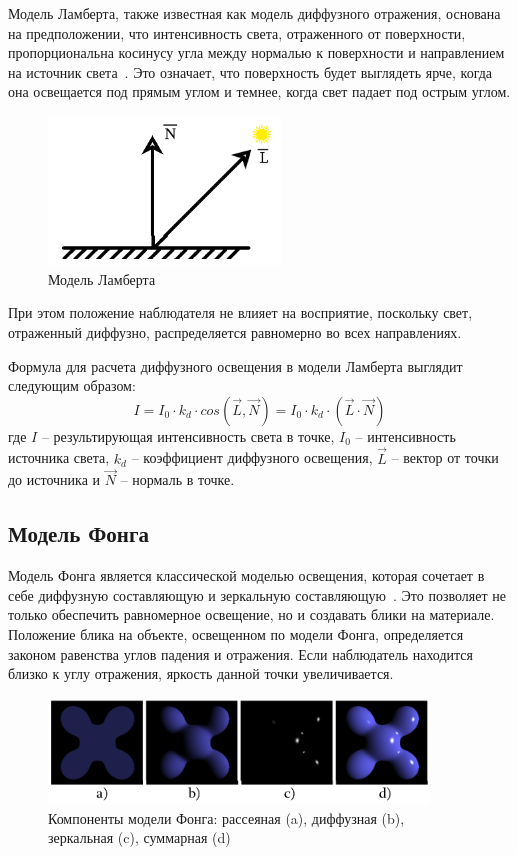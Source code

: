 Модель Ламберта, также известная как модель диффузного отражения, основана на предположении, что интенсивность света, отраженного от поверхности, пропорциональна косинусу угла между нормалью к поверхности и направлением на источник света~\cite{lit3, lit7}. Это означает, что поверхность будет выглядеть ярче, когда она освещается под прямым углом и темнее, когда свет падает под острым углом. 
\begin{figure}[h] 
	\centering
	\includegraphics[width=0.55\textwidth]{images/lambert.png}
	\caption{Модель Ламберта} 
	\label{fig:lambert} 
\end{figure}

При этом положение наблюдателя не влияет на восприятие, поскольку свет, отраженный диффузно, распределяется равномерно во всех направлениях.

Формула для расчета диффузного освещения в модели Ламберта выглядит следующим образом:
\begin{equation}
	I = I_0 \cdot k_d \cdot cos(\vec{L}, \vec{N}) = I_0 \cdot k_d \cdot (\vec{L} \cdot \vec{N})
	\label{eq:lambert}
\end{equation}
где $I$ -- результирующая интенсивность света в точке, $I_0$ -- интенсивность источника света, $k_d$ -- коэффициент диффузного освещения, $\vec{L}$ -- вектор от точки до источника и $\vec{N}$ -- нормаль в точке.

\subsection{Модель Фонга}
Модель Фонга является классической моделью освещения, которая сочетает в себе диффузную составляющую и зеркальную составляющую~\cite{lit3, lit7}. Это позволяет не только обеспечить равномерное освещение, но и создавать блики на материале. Положение блика на объекте, освещенном по модели Фонга, определяется законом равенства углов падения и отражения. Если наблюдатель находится близко к углу отражения, яркость данной точки увеличивается.
\begin{figure}[h] 
	\centering
	\includegraphics[width=0.9\textwidth]{images/phong-example.png}
	\caption{Компоненты модели Фонга: рассеяная (a), диффузная (b), зеркальная (c), суммарная (d)} 
	\label{fig:phong-example} 
\end{figure}

